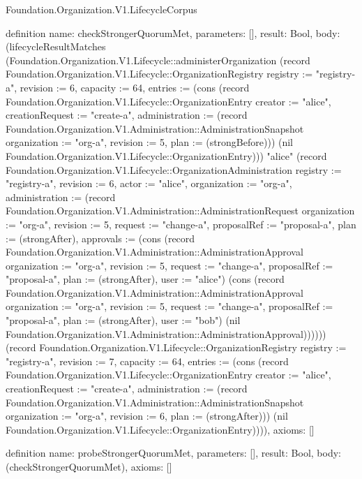 \begin{lexlean}{Foundation.Organization.V1.LifecycleCorpus}
\begin{semanticmodule}
definition{
  name: checkStrongerQuorumMet,
  parameters: [],
  result: Bool,
  body: (lifecycleResultMatches (Foundation.Organization.V1.Lifecycle::administerOrganization (record Foundation.Organization.V1.Lifecycle::OrganizationRegistry {registry := "registry-a", revision := 6, capacity := 64, entries := (cons (record Foundation.Organization.V1.Lifecycle::OrganizationEntry {creator := "alice", creationRequest := "create-a", administration := (record Foundation.Organization.V1.Administration::AdministrationSnapshot {organization := "org-a", revision := 5, plan := (strongBefore)})}) (nil Foundation.Organization.V1.Lifecycle::OrganizationEntry))}) "alice" (record Foundation.Organization.V1.Lifecycle::OrganizationAdministration {registry := "registry-a", revision := 6, actor := "alice", organization := "org-a", administration := (record Foundation.Organization.V1.Administration::AdministrationRequest {organization := "org-a", revision := 5, request := "change-a", proposalRef := "proposal-a", plan := (strongAfter), approvals := (cons (record Foundation.Organization.V1.Administration::AdministrationApproval {organization := "org-a", revision := 5, request := "change-a", proposalRef := "proposal-a", plan := (strongAfter), user := "alice"}) (cons (record Foundation.Organization.V1.Administration::AdministrationApproval {organization := "org-a", revision := 5, request := "change-a", proposalRef := "proposal-a", plan := (strongAfter), user := "bob"}) (nil Foundation.Organization.V1.Administration::AdministrationApproval)))})})) (record Foundation.Organization.V1.Lifecycle::OrganizationRegistry {registry := "registry-a", revision := 7, capacity := 64, entries := (cons (record Foundation.Organization.V1.Lifecycle::OrganizationEntry {creator := "alice", creationRequest := "create-a", administration := (record Foundation.Organization.V1.Administration::AdministrationSnapshot {organization := "org-a", revision := 6, plan := (strongAfter)})}) (nil Foundation.Organization.V1.Lifecycle::OrganizationEntry))})),
  axioms: []
}

definition{
  name: probeStrongerQuorumMet,
  parameters: [],
  result: Bool,
  body: (checkStrongerQuorumMet),
  axioms: []
}


\end{semanticmodule}
\end{lexlean}
